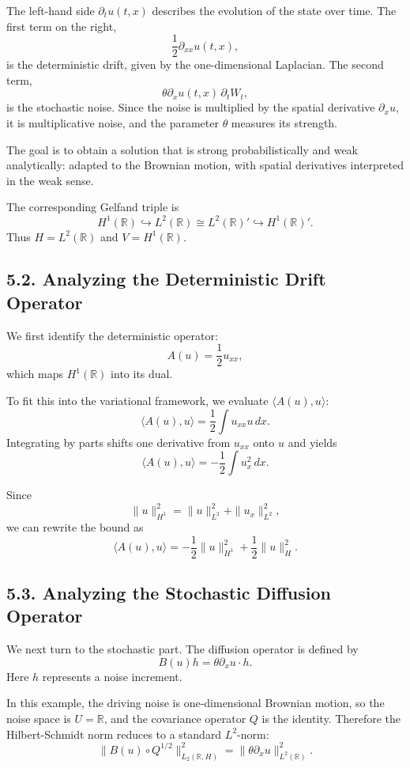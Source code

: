 \documentclass[11pt]{article}
\theoremstyle{definition}
\theoremstyle{remark}
\begin{document}
The left-hand side \(\partial_t u(t,x)\) describes the evolution of the state over time. The first term on the right,
\[
\frac12 \partial_{xx}u(t,x),
\]
is the deterministic drift, given by the one-dimensional Laplacian. The second term,
\[
\theta \partial_x u(t,x)\,\partial_t W_t,
\]
is the stochastic noise. Since the noise is multiplied by the spatial derivative \(\partial_x u\), it is multiplicative noise, and the parameter \(\theta\) measures its strength.

The goal is to obtain a solution that is strong probabilistically and weak analytically: adapted to the Brownian motion, with spatial derivatives interpreted in the weak sense.

The corresponding Gelfand triple is
\[
H^1(\mathbb R)\hookrightarrow L^2(\mathbb R)\cong L^2(\mathbb R)'\hookrightarrow H^1(\mathbb R)'.
\]
Thus \(H=L^2(\mathbb R)\) and \(V=H^1(\mathbb R)\).

\subsection*{5.2. Analyzing the Deterministic Drift Operator}
We first identify the deterministic operator:
\[
A(u)=\frac12 u_{xx},
\]
which maps \(H^1(\mathbb R)\) into its dual.

To fit this into the variational framework, we evaluate \(\langle A(u),u\rangle\):
\[
\langle A(u),u\rangle=\frac12 \int u_{xx}u\,dx.
\]
Integrating by parts shifts one derivative from \(u_{xx}\) onto \(u\) and yields
\[
\langle A(u),u\rangle=-\frac12 \int u_x^2\,dx.
\]

Since
\[
\|u\|_{H^1}^2=\|u\|_{L^2}^2+\|u_x\|_{L^2}^2,
\]
we can rewrite the bound as
\[
\langle A(u),u\rangle
=
-\frac12 \|u\|_{H^1}^2+\frac12 \|u\|_H^2.
\]

\subsection*{5.3. Analyzing the Stochastic Diffusion Operator}
We next turn to the stochastic part. The diffusion operator is defined by
\[
B(u)h=\theta \partial_x u\cdot h.
\]
Here \(h\) represents a noise increment.

In this example, the driving noise is one-dimensional Brownian motion, so the noise space is \(U=\mathbb R\), and the covariance operator \(Q\) is the identity. Therefore the Hilbert-Schmidt norm reduces to a standard \(L^2\)-norm:
\[
\|B(u)\circ Q^{1/2}\|_{L_2(\mathbb R,H)}^2
=
\|\theta \partial_x u\|_{L^2(\mathbb R)}^2.
\]
\end{document}

